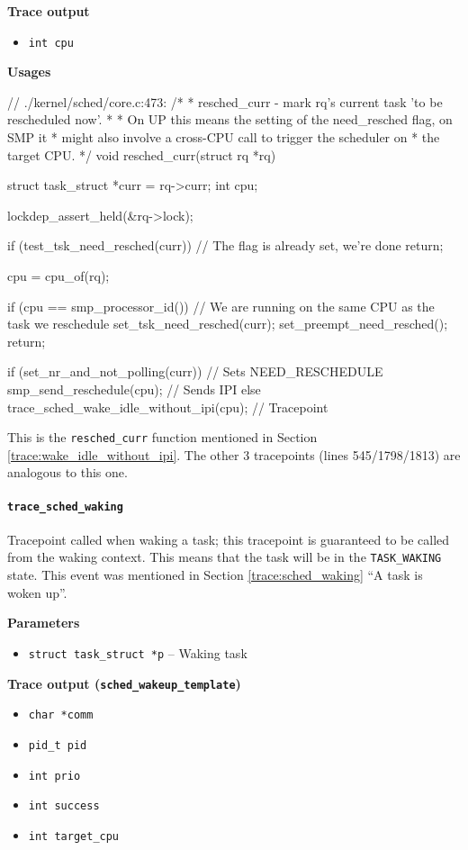 \textbf{Trace output}
\begin{itemize}
    \item \verb|int cpu|
\end{itemize}

\textbf{Usages}
\label{sec:resched_curr}
\begin{code}
// ./kernel/sched/core.c:473:
/*
 * resched_curr - mark rq's current task 'to be rescheduled now'.
 *
 * On UP this means the setting of the need_resched flag, on SMP it
 * might also involve a cross-CPU call to trigger the scheduler on
 * the target CPU.
 */
void resched_curr(struct rq *rq){
	struct task_struct *curr = rq->curr;
	int cpu;

	lockdep_assert_held(&rq->lock);

	if (test_tsk_need_resched(curr)) // The flag is already set, we're done
		return;

	cpu = cpu_of(rq);

	if (cpu == smp_processor_id()) { // We are running on the same CPU as the task we reschedule
		set_tsk_need_resched(curr);
		set_preempt_need_resched();
		return;
	}

	if (set_nr_and_not_polling(curr)) // Sets NEED_RESCHEDULE
		smp_send_reschedule(cpu); // Sends IPI
	else
		trace_sched_wake_idle_without_ipi(cpu); // Tracepoint
}
\end{code}
This is the \verb|resched_curr| function mentioned in Section \ref{trace:wake_idle_without_ipi}. The other 3 tracepoints (lines 545/1798/1813) are analogous to this one.

\paragraph{\texttt{trace\_sched\_waking}}
Tracepoint called when waking a task; this tracepoint is guaranteed to be called from the waking context. This means that the task will be in the \verb|TASK_WAKING| state.
This event was mentioned in Section \ref{trace:sched_waking} ``A task is woken up''.

\textbf{Parameters}
\begin{itemize}
    \item \verb|struct task_struct *p| -- Waking task
\end{itemize}

\textbf{Trace output (\texttt{sched\_wakeup\_template})}
\begin{itemize}
    \item \verb|char *comm|
    \item \verb|pid_t pid|
    \item \verb|int prio|
    \item \verb|int success|
    \item \verb|int target_cpu|
\end{itemize}

